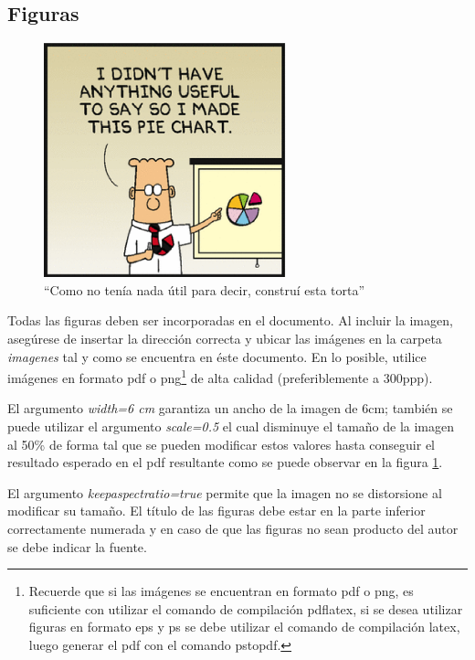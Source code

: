 \documentclass[a4paper,10pt,twoside]{article}
\begin{document}
  \subsection{Figuras}
  
\begin{figure}%
	\begin{center}
	\includegraphics[width=7cm,keepaspectratio=true]{./imagenes/pie}
	\end{center}
	\caption{``Como no ten\'ia nada \'util para decir, constru\'i esta torta'' \citep{Adams2009} \citep{Olaya2015}}
	\label{fig1}
\end{figure}   
  
  Todas las figuras deben ser incorporadas en el documento. Al incluir la imagen, asegúrese de insertar la dirección correcta y ubicar las imágenes en la carpeta \emph{imagenes} tal y como se encuentra en éste documento. En lo posible, utilice imágenes en formato pdf o png\footnote{Recuerde que si las imágenes se encuentran en formato pdf o png, es suficiente con utilizar el comando de compilación pdflatex, si se desea utilizar figuras en formato eps y ps se debe utilizar el comando de compilación latex, luego generar el pdf con el comando pstopdf.} de alta calidad (preferiblemente a 300ppp).
  
  El argumento \emph{width=6 cm} garantiza un ancho de la imagen de 6cm; también se puede utilizar el argumento \emph{scale=0.5} el cual disminuye el tamaño de la imagen al 50\% de forma tal que se pueden modificar estos valores hasta conseguir el resultado esperado en el pdf resultante como se puede observar en la figura \ref{fig1}. 
  
  El argumento \emph{keepaspectratio=true} permite que la imagen no se distorsione al modificar su tamaño. El título de las figuras debe estar en la parte inferior correctamente numerada y en caso de que las figuras no sean producto del autor se debe indicar la fuente.
  
\end{document}
